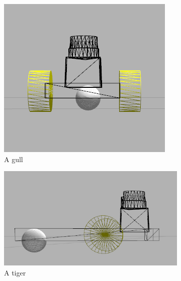 \documentclass[10pt,journal,compsoc]{IEEEtran}
\begin{document}
\begin{figure}
    \centering
    \begin{subfigure}[b]{0.3\textwidth}
        \includegraphics[width=\textwidth]{robokoko-design-1}
        \caption{A gull}
        \label{fig:gull}
    \end{subfigure}
    \begin{subfigure}[b]{0.3\textwidth}
        \includegraphics[width=\textwidth]{robokoko-design-2}
        \caption{A tiger}
        \label{fig:tiger}
    \end{subfigure}
    \begin{subfigure}[b]{0.3\textwidth}

\end{subfigure}
\end{figure}
\end{document}
